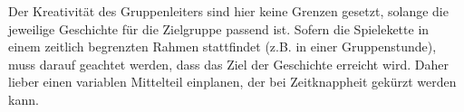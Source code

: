 Der Kreativität des Gruppenleiters sind hier keine Grenzen gesetzt, solange die jeweilige 
Geschichte für die Zielgruppe passend ist. Sofern die Spielekette in einem zeitlich begrenzten 
Rahmen stattfindet (z.B. in einer Gruppenstunde), muss darauf geachtet werden, dass das Ziel der 
Geschichte erreicht wird. Daher lieber einen variablen Mittelteil einplanen, der bei Zeitknappheit 
gekürzt werden kann.
